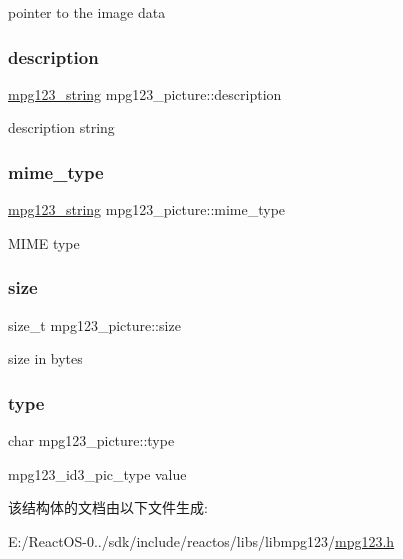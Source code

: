 pointer to the image data \mbox{\label{structmpg123__picture_a2bd7ec13cbd4cbe673cdccf5a0603a94}} 
\subsubsection{\texorpdfstring{description}{description}}
{\footnotesize\ttfamily \hyperlink{structmpg123__string}{mpg123\+\_\+string} mpg123\+\_\+picture\+::description}

description string \mbox{\label{structmpg123__picture_ac36b86a29200e2df5ee60e9d73c231a6}} 
\subsubsection{\texorpdfstring{mime\+\_\+type}{mime\_type}}
{\footnotesize\ttfamily \hyperlink{structmpg123__string}{mpg123\+\_\+string} mpg123\+\_\+picture\+::mime\+\_\+type}

M\+I\+ME type \mbox{\label{structmpg123__picture_adac68a10895739d1d1772f6340c384eb}} 
\subsubsection{\texorpdfstring{size}{size}}
{\footnotesize\ttfamily size\+\_\+t mpg123\+\_\+picture\+::size}

size in bytes \mbox{\label{structmpg123__picture_a4b5897550d36cad90aa463e318a7ca54}} 
\subsubsection{\texorpdfstring{type}{type}}
{\footnotesize\ttfamily char mpg123\+\_\+picture\+::type}

mpg123\+\_\+id3\+\_\+pic\+\_\+type value 

该结构体的文档由以下文件生成\+:\begin{DoxyCompactItemize}
\item 
E\+:/\+React\+O\+S-\/0../sdk/include/reactos/libs/libmpg123/\hyperlink{mpg123_8h}{mpg123.\+h}\end{DoxyCompactItemize}
